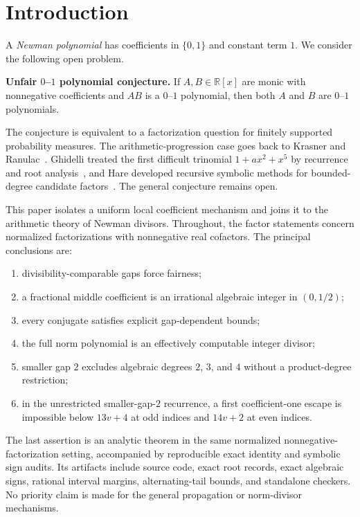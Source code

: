 \documentclass[11pt]{article}
\theoremstyle{remark}
\numberwithin{equation}{section}
\begin{document}
\section{Introduction}

A \emph{Newman polynomial} has coefficients in $\{0,1\}$ and constant term
$1$.  We consider the following open problem.

\medskip
\noindent\textbf{Unfair $0$--$1$ polynomial conjecture.}
If $A,B\in\mathbb R[x]$ are monic with nonnegative coefficients and $AB$ is a
$0$--$1$ polynomial, then both $A$ and $B$ are $0$--$1$ polynomials.
\medskip

The conjecture is equivalent to a factorization question for finitely
supported probability measures.  The arithmetic-progression case goes back
to Krasner and Ranulac~\cite{KR}.  Ghidelli treated the first difficult
trinomial $1+a x^2+x^5$ by recurrence and root analysis~\cite{Ghidelli}, and
Hare developed recursive symbolic methods for bounded-degree candidate
factors~\cite{Hare}.  The general conjecture remains open.

This paper isolates a uniform local coefficient mechanism and joins it to the
arithmetic theory of Newman divisors.  Throughout, the factor statements concern
normalized factorizations with nonnegative real cofactors.  The principal
conclusions are:
\begin{enumerate}
\item divisibility-comparable gaps force fairness;
\item a fractional middle coefficient is an irrational algebraic integer in
      $(0,1/2)$;
\item every conjugate satisfies explicit gap-dependent bounds;
\item the full norm polynomial is an effectively computable integer divisor;
\item smaller gap $2$ excludes algebraic degrees $2$, $3$, and $4$ without a
      product-degree restriction;
\item in the unrestricted smaller-gap-$2$ recurrence, a first coefficient-one
      escape is impossible below $13v+4$ at odd indices and $14v+2$ at even
      indices.
\end{enumerate}
The last assertion is an analytic theorem in the same normalized
nonnegative-factorization setting, accompanied by reproducible exact identity
and symbolic sign audits.  Its artifacts include source code, exact root
records, exact algebraic signs, rational interval margins, alternating-tail
bounds, and standalone checkers.
No priority claim is made for the general propagation or norm-divisor
mechanisms.
\end{document}
